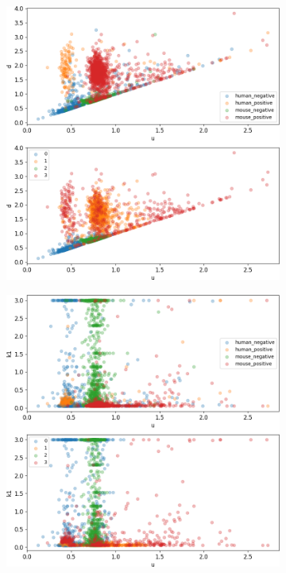 \begin{figure}
\begin{subfigure}{0.49\textwidth}
	\end{subfigure}
	\hfill
	\begin{subfigure}{0.49\textwidth}
		\includegraphics[width=\textwidth]{fig/seperate_u_d}
	\end{subfigure}
	\hfill
	\begin{subfigure}{0.49\textwidth}
		\includegraphics[width=\textwidth]{fig/seperate_u_k1}

\end{subfigure}
\end{figure}
